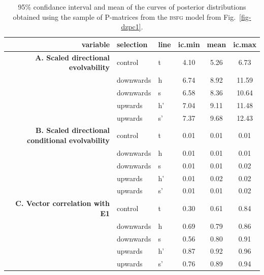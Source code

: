 \begin{refsection}
\begin{table}
\centering
\caption[Directional matrix statistics confidence intervals]{95\% confidance interval and mean of the curves of posterior distributions obtained using the sample of P-matrices from the \textsc{bsfg} model from Fig.~\ref{fig-dzpc1}.}
\begin{tabular}{rllccc}
  \hline
variable & selection & line & ic.min & mean & ic.max \\
  \hline
\textbf{A. Scaled directional evolvability} & control & t & 4.10 & 5.26 & 6.73 \\
  & downwards & h & 6.74 & 8.92 & 11.59 \\
   & downwards & s & 6.58 & 8.36 & 10.64 \\
   & upwards & h' & 7.04 & 9.11 & 11.48 \\
   & upwards & s' & 7.37 & 9.68 & 12.43 \\
\textbf{B. Scaled directional conditional evolvability} & control & t & 0.01 & 0.01 & 0.01 \\
   & downwards & h & 0.01 & 0.01 & 0.01 \\
   & downwards & s & 0.01 & 0.01 & 0.02 \\
   & upwards & h' & 0.01 & 0.02 & 0.02 \\
   & upwards & s' & 0.01 & 0.01 & 0.02 \\
\textbf{C. Vector correlation with E1} & control & t & 0.30 & 0.61 & 0.84 \\
   & downwards & h & 0.69 & 0.79 & 0.86 \\
   & downwards & s & 0.56 & 0.80 & 0.91 \\
   & upwards & h' & 0.87 & 0.92 & 0.96 \\
   & upwards & s' & 0.76 & 0.89 & 0.94 \\
   \hline
\end{tabular}
\label{sup:directmatstatconf}
\end{table}


\end{refsection}

